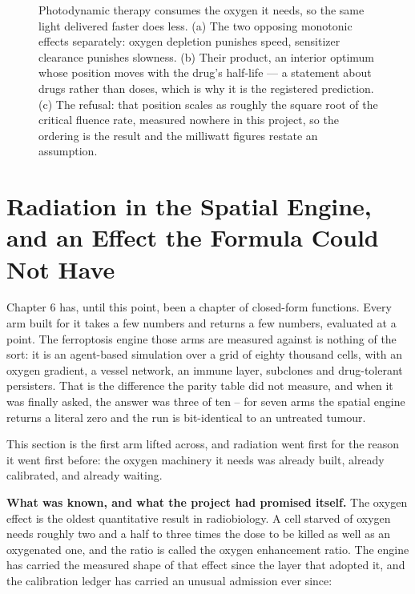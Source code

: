 \documentclass[11pt,twoside,openright]{report}
\begin{document}
\begin{figure}[tbp]
\setcounter{figure}{39}
\caption{Photodynamic therapy consumes the oxygen it needs, so the same light delivered faster does less. (a) The two opposing monotonic effects separately: oxygen depletion punishes speed, sensitizer clearance punishes slowness. (b) Their product, an interior optimum whose position moves with the drug's half-life --- a statement about drugs rather than doses, which is why it is the registered prediction. (c) The refusal: that position scales as roughly the square root of the critical fluence rate, measured nowhere in this project, so the ordering is the result and the milliwatt figures restate an assumption.}
\label{fig:fig44_pdt_fluence_rate}
\end{figure}

\section{Radiation in the Spatial Engine, and an Effect the Formula Could Not Have}

Chapter 6 has, until this point, been a chapter of closed-form functions. Every arm built for it takes a few numbers and returns a few numbers, evaluated at a point. The ferroptosis engine those arms are measured against is nothing of the sort: it is an agent-based simulation over a grid of eighty thousand cells, with an oxygen gradient, a vessel network, an immune layer, subclones and drug-tolerant persisters. That is the difference the parity table did not measure, and when it was finally asked, the answer was three of ten -- for seven arms the spatial engine returns a literal zero and the run is bit-identical to an untreated tumour.

This section is the first arm lifted across, and radiation went first for the reason it went first before: the oxygen machinery it needs was already built, already calibrated, and already waiting.

\textbf{What was known, and what the project had promised itself.} The oxygen effect is the oldest quantitative result in radiobiology. A cell starved of oxygen needs roughly two and a half to three times the dose to be killed as well as an oxygenated one, and the ratio is called the oxygen enhancement ratio. The engine has carried the measured shape of that effect since the layer that adopted it, and the calibration ledger has carried an unusual admission ever since:
\end{document}
